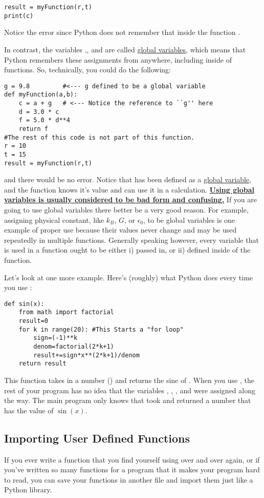 \begin{Verbatim}
result = myFunction(r,t)
print(c)
\end{Verbatim}
Notice the error since Python does not remember that inside the function .

In contrast, the variables ,, and  are
called \ul{global variables}, which means that Python remembers these
assignments from anywhere, including inside of functions.  So,
technically, you could do the following:

\begin{Verbatim}
g = 9.8         #<--- g defined to be a global variable
def myFunction(a,b):
    c = a + g   # <--- Notice the reference to ``g'' here
    d = 3.0 * c
    f = 5.0 * d**4
    return f
#The rest of this code is not part of this function.
r = 10
t = 15
result = myFunction(r,t)
\end{Verbatim}
and there would be no error.  Notice that  has been defined as
a \ul{global variable}, and the function  knows it's
value and can use it in a calculation.  \textbf{\ul{ Using global
    variables is usually considered to be bad form and confusing.}}
If you are going to use global variables there better be a very good
reason.  For example, assigning physical constant, like $k_B$, $G$, or
$\epsilon_0$, to be global variables is one example of proper use
because their values never change and may be used repeatedly in
multiple functions.  Generally speaking however, every variable that
is used in a function ought to be either i) passed in, or ii) defined
inside of the function.

Let's look at one more example.  Here's (roughly) what Python does
every time you use :
\begin{Verbatim}
def sin(x):
    from math import factorial
    result=0
    for k in range(20): #This Starts a "for loop"
        sign=(-1)**k
        denom=factorial(2*k+1)
        result+=sign*x**(2*k+1)/denom
    return result
\end{Verbatim}
This function takes in a number () and returns the sine of .  When you use , the rest of your program has no idea that the variables , , , and  were assigned along the way.  The main program only knows that  took  and returned a number that has the value of $\sin(x)$.

\subsection*{Importing User Defined Functions}
If you ever write a function that you find yourself using over and over again, or if you've written so many functions for a program that it makes your program hard to read, you can save your functions in another file and import them just like a Python library.

